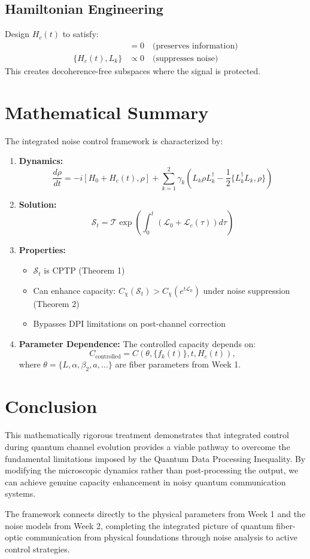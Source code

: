 \documentclass[11pt]{article}
\begin{document}
\subsection{Hamiltonian Engineering}
Design $H_c(t)$ to satisfy:
\begin{align*}
[H_c(t), H_{\text{signal}}] &= 0 \quad \text{(preserves information)} \\
\{H_c(t), L_k\} &\propto 0 \quad \text{(suppresses noise)}
\end{align*}
This creates decoherence-free subspaces where the signal is protected.

\section{Mathematical Summary}
The integrated noise control framework is characterized by:

\begin{enumerate}
\item \textbf{Dynamics:}
\[
\frac{d\rho}{dt} = -i[H_0 + H_c(t), \rho] + \sum_{k=1}^2 \gamma_k \left( L_k \rho L_k^\dagger - \frac{1}{2}\{L_k^\dagger L_k, \rho\} \right)
\]

\item \textbf{Solution:}
\[
\mathcal{S}_t = \mathcal{T} \exp\left( \int_0^t (\mathcal{L}_0 + \mathcal{L}_c(\tau)) d\tau \right)
\]

\item \textbf{Properties:}
\begin{itemize}
\item $\mathcal{S}_t$ is CPTP (Theorem 1)
\item Can enhance capacity: $C_\chi(\mathcal{S}_t) > C_\chi(e^{t\mathcal{L}_0})$ under noise suppression (Theorem 2)
\item Bypasses DPI limitations on post-channel correction
\end{itemize}

\item \textbf{Parameter Dependence:} The controlled capacity depends on:
\[
C_{\text{controlled}} = C(\theta, \{f_k(t)\}, t, H_c(t)),
\]
where $\theta = \{L, \alpha, \beta_2, a, \dots\}$ are fiber parameters from Week 1.
\end{enumerate}

\section{Conclusion}
This mathematically rigorous treatment demonstrates that integrated control during quantum channel evolution provides a viable pathway to overcome the fundamental limitations imposed by the Quantum Data Processing Inequality. By modifying the microscopic dynamics rather than post-processing the output, we can achieve genuine capacity enhancement in noisy quantum communication systems.

The framework connects directly to the physical parameters from Week 1 and the noise models from Week 2, completing the integrated picture of quantum fiber-optic communication from physical foundations through noise analysis to active control strategies.
\end{document}
